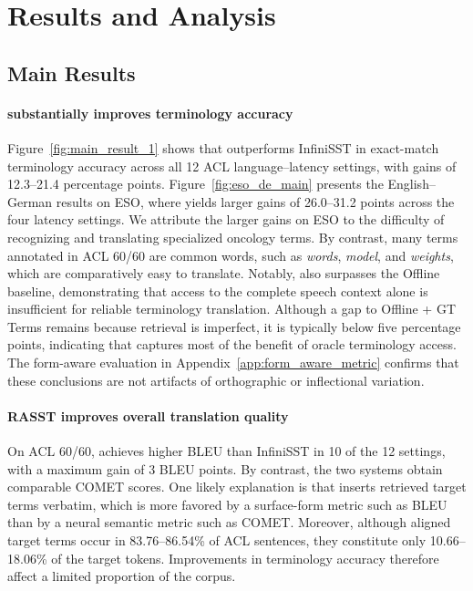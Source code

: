 
\section{Results and Analysis}




\subsection{Main Results}

\paragraph{\method substantially improves terminology accuracy}
Figure~\ref{fig:main_result_1} shows that \method outperforms InfiniSST in exact-match terminology accuracy across all 12 ACL language--latency settings, with gains of 12.3--21.4 percentage points. Figure~\ref{fig:eso_de_main} presents the English--German results on ESO, where \method yields larger gains of 26.0--31.2 points across the four latency settings. We attribute the larger gains on ESO to the difficulty of recognizing and translating specialized oncology terms. By contrast, many terms annotated in ACL 60/60 are common words, such as \emph{words}, \emph{model}, and \emph{weights}, which are comparatively easy to translate. Notably, \method also surpasses the Offline baseline, demonstrating that access to the complete speech context alone is insufficient for reliable terminology translation. Although a gap to Offline + GT Terms remains because retrieval is imperfect, it is typically below five percentage points, indicating that \method captures most of the benefit of oracle terminology access. The form-aware evaluation in Appendix~\ref{app:form_aware_metric} confirms that these conclusions are not artifacts of orthographic or inflectional variation.

\paragraph{RASST improves overall translation quality}
On ACL 60/60, \method achieves higher BLEU than InfiniSST in 10 of the 12 settings, with a maximum gain of 3 BLEU points. By contrast, the two systems obtain comparable COMET scores. One likely explanation is that \method inserts retrieved target terms verbatim, which is more favored by a surface-form metric such as BLEU than by a neural semantic metric such as COMET. Moreover, although aligned target terms occur in 83.76--86.54\% of ACL sentences, they constitute only 10.66--18.06\% of the target tokens. Improvements in terminology accuracy therefore affect a limited proportion of the corpus.

